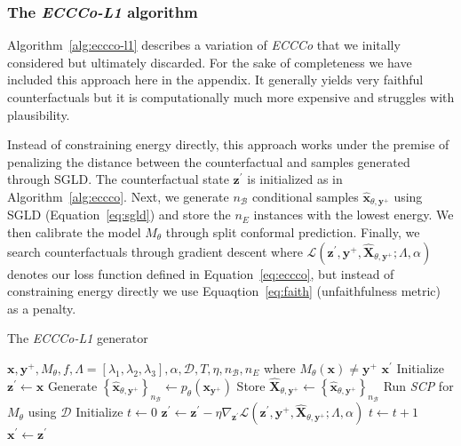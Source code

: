 \subsubsection{The \textit{ECCCo-L1} algorithm}

Algorithm~\ref{alg:eccco-l1} describes a variation of \textit{ECCCo} that we initally considered but ultimately discarded. For the sake of completeness we have included this approach here in the appendix. It generally yields very faithful counterfactuals but it is computationally much more expensive and struggles with plausibility.

Instead of constraining energy directly, this approach works under the premise of penalizing the distance between the counterfactual and samples generated through SGLD. The counterfactual state $\mathbf{z}^\prime$ is initialized as in Algorithm~\ref{alg:eccco}. Next, we generate $n_{\mathcal{B}}$ conditional samples $\hat{\mathbf{x}}_{\theta,\mathbf{y}^+}$ using SGLD (Equation~\ref{eq:sgld}) and store the $n_E$ instances with the lowest energy. We then calibrate the model $M_{\theta}$ through split conformal prediction. Finally, we search counterfactuals through gradient descent where $\mathcal{L}(\mathbf{z}^\prime,\mathbf{y}^+,\widehat{\mathbf{X}}_{\theta,\mathbf{y}^+}; \Lambda, \alpha)$ denotes our loss function defined in Equation~\ref{eq:eccco}, but instead of constraining energy directly we use Equaqtion~\ref{eq:faith} (unfaithfulness metric) as a penalty.

\begin{algorithm*}[h]
  \caption{The \textit{ECCCo-L1} generator}\label{alg:eccco-l1}
  \begin{algorithmic}[1]
    \Require $\mathbf{x}, \mathbf{y}^+, M_{\theta}, f, \Lambda=[\lambda_1,\lambda_2,\lambda_3], \alpha, \mathcal{D}, T, \eta, n_{\mathcal{B}}, n_E$ where $M_{\theta}(\mathbf{x})\neq\mathbf{y}^+$
    \Ensure $\mathbf{x}^\prime$
    \State Initialize $\mathbf{z}^\prime \gets \mathbf{x}$ 
    \State Generate $\left\{\hat{\mathbf{x}}_{\theta,\mathbf{y}^+}\right\}_{n_{\mathcal{B}}} \gets p_{\theta}(\mathbf{x}_{\mathbf{y}^+})$ 
    \State Store $\widehat{\mathbf{X}}_{\theta,\mathbf{y}^+} \gets \left\{\hat{\mathbf{x}}_{\theta,\mathbf{y}^+}\right\}_{n_{\mathcal{B}}}$ 
    \State Run \textit{SCP} for $M_{\theta}$ using $\mathcal{D}$ 
    \State Initialize $t \gets 0$
     
    \State $\mathbf{z}^\prime \gets \mathbf{z}^\prime - \eta \nabla_{\mathbf{z}^\prime} \mathcal{L}(\mathbf{z}^\prime,\mathbf{y}^+,\widehat{\mathbf{X}}_{\theta,\mathbf{y}^+}; \Lambda, \alpha)$ 
    \State $t \gets t+1$
    \EndWhile
    \State $\mathbf{x}^\prime \gets \mathbf{z}^\prime$
  \end{algorithmic}
\end{algorithm*}

